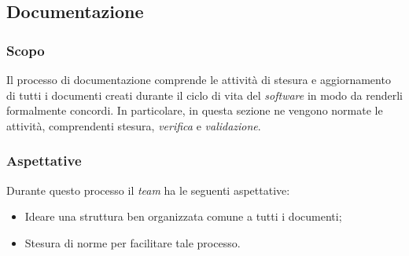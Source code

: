 \subsection{Documentazione}
	\subsubsection{Scopo}
	Il processo di documentazione comprende le attività di stesura e aggiornamento di tutti i documenti creati durante il ciclo di vita del \emph{software} in modo da renderli formalmente concordi. In particolare, in questa sezione ne vengono normate le attività, comprendenti stesura, \emph{verifica} e \emph{validazione}. 
	
	\subsubsection{Aspettative}
	Durante questo processo il \emph{team} ha le seguenti aspettative:
		\begin{itemize}
			\item Ideare una struttura ben organizzata comune a tutti i documenti;
			\item Stesura di norme per facilitare tale processo.
		\end{itemize}
	
